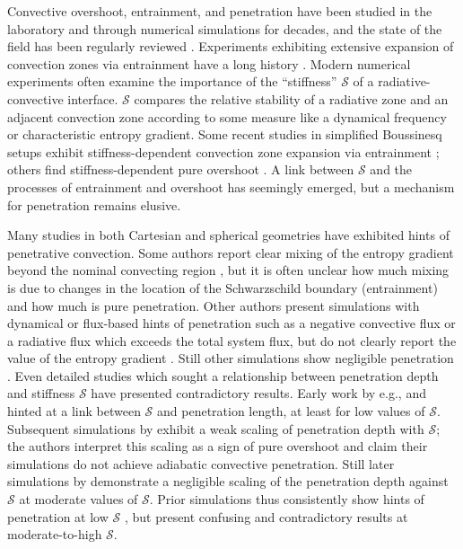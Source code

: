 \documentclass[twocolumn, linenumbers]{aastex631}
\newcommand{\mS}{\ensuremath{\mathcal{S}}}
\begin{document}
Convective overshoot, entrainment, and penetration have been studied in the laboratory and through numerical simulations for decades, and the state of the field has been regularly reviewed \citep[e.g.,][]{marcus_etal_1983, zahn1991, browning_etal_2004, rogers_etal_2006, viallet_etal_2015, korre_etal_2019}.
Experiments exhibiting extensive expansion of convection zones via entrainment have a long history \citep[e.g.,][and this process is often confusingly called ``penetration'']{musman1968, deardorff_etal_1969, moore_weiss_1973}.
Modern numerical experiments often examine the importance of the ``stiffness'' $\mS$ of a radiative-convective interface.
$\mS$ compares the relative stability of a radiative zone and an adjacent convection zone according to some measure like a dynamical frequency or characteristic entropy gradient.
Some recent studies in simplified Boussinesq setups exhibit stiffness-dependent convection zone expansion via entrainment \citep{couston_etal_2017, toppaladoddi_wettlaufer_2018}; others find stiffness-dependent pure overshoot \citep{korre_etal_2019}.
A link between $\mS$ and the processes of entrainment and overshoot has seemingly emerged, but a mechanism for penetration remains elusive.

Many studies in both Cartesian and spherical geometries have exhibited hints of penetrative convection.
Some authors report clear mixing of the entropy gradient beyond the nominal convecting region \citep{hurlburt_etal_1994, saikia_etal_2000, brummell_etal_2002, rogers_glatzmaier_2005, rogers_etal_2006, kitiashvili_etal_2016}, but it is often unclear how much mixing is due to changes in the location of the Schwarzschild boundary (entrainment) and how much is pure penetration.
Other authors present simulations with dynamical or flux-based hints of penetration such as a negative convective flux or a radiative flux which exceeds the total system flux, but do not clearly report the value of the entropy gradient \citep{hurlburt_etal_1986, singh_etal_1995, browning_etal_2004, brun_etal_2017, pratt_etal_2017}.
Still other simulations show negligible penetration \citep[e.g.,][]{cai2020, higl_etal_2021}.
Even detailed studies which sought a relationship between penetration depth and stiffness $\mS$ have presented contradictory results.
Early work by e.g., \citet{hurlburt_etal_1994} and \citet{singh_etal_1995} hinted at a link between $\mS$ and penetration length, at least for low values of $\mS$.
Subsequent simulations by \citet{brummell_etal_2002} exhibit a weak scaling of penetration depth with $\mS$; the authors interpret this scaling as a sign of pure overshoot and claim their simulations do not achieve adiabatic convective penetration.
Still later simulations by \citet{rogers_glatzmaier_2005} demonstrate a negligible scaling of the penetration depth against $\mS$ at moderate values of $\mS$.
Prior simulations thus consistently show hints of penetration at low $\mS$ \citep[where results may not be relevant for stars,][]{couston_etal_2017}, but present confusing and contradictory results at moderate-to-high $\mS$.
\end{document}
